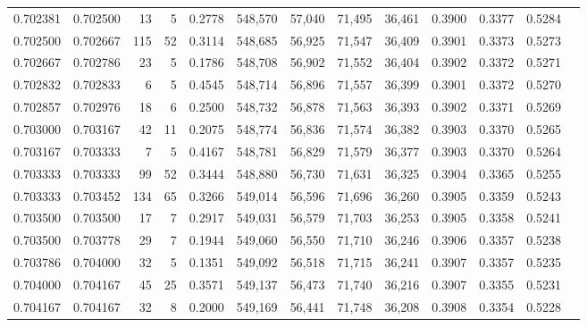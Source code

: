 \begin{tabular}{rrrrrrrrrrrrr}
0.702381 & 0.702500 &    13 &   5 &                                     0.2778 & 548,570 &  57,040 &  71,495 &  36,461 & 0.3900 & 0.3377 & 0.5284 \\
0.702500 & 0.702667 &   115 &  52 &                                     0.3114 & 548,685 &  56,925 &  71,547 &  36,409 & 0.3901 & 0.3373 & 0.5273 \\
0.702667 & 0.702786 &    23 &   5 &                                     0.1786 & 548,708 &  56,902 &  71,552 &  36,404 & 0.3902 & 0.3372 & 0.5271 \\
0.702832 & 0.702833 &     6 &   5 &                                     0.4545 & 548,714 &  56,896 &  71,557 &  36,399 & 0.3901 & 0.3372 & 0.5270 \\
0.702857 & 0.702976 &    18 &   6 &                                     0.2500 & 548,732 &  56,878 &  71,563 &  36,393 & 0.3902 & 0.3371 & 0.5269 \\
0.703000 & 0.703167 &    42 &  11 &                                     0.2075 & 548,774 &  56,836 &  71,574 &  36,382 & 0.3903 & 0.3370 & 0.5265 \\
0.703167 & 0.703333 &     7 &   5 &                                     0.4167 & 548,781 &  56,829 &  71,579 &  36,377 & 0.3903 & 0.3370 & 0.5264 \\
0.703333 & 0.703333 &    99 &  52 &                                     0.3444 & 548,880 &  56,730 &  71,631 &  36,325 & 0.3904 & 0.3365 & 0.5255 \\
0.703333 & 0.703452 &   134 &  65 &                                     0.3266 & 549,014 &  56,596 &  71,696 &  36,260 & 0.3905 & 0.3359 & 0.5243 \\
0.703500 & 0.703500 &    17 &   7 &                                     0.2917 & 549,031 &  56,579 &  71,703 &  36,253 & 0.3905 & 0.3358 & 0.5241 \\
0.703500 & 0.703778 &    29 &   7 &                                     0.1944 & 549,060 &  56,550 &  71,710 &  36,246 & 0.3906 & 0.3357 & 0.5238 \\
0.703786 & 0.704000 &    32 &   5 &                                     0.1351 & 549,092 &  56,518 &  71,715 &  36,241 & 0.3907 & 0.3357 & 0.5235 \\
0.704000 & 0.704167 &    45 &  25 &                                     0.3571 & 549,137 &  56,473 &  71,740 &  36,216 & 0.3907 & 0.3355 & 0.5231 \\
0.704167 & 0.704167 &    32 &   8 &                                     0.2000 & 549,169 &  56,441 &  71,748 &  36,208 & 0.3908 & 0.3354 & 0.5228 \\

\end{tabular}
